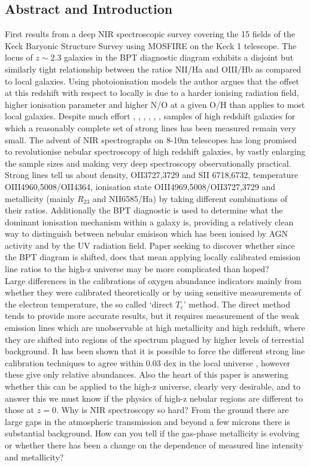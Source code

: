 \documentclass{literature}
\begin{document}
\subsection{Abstract and Introduction}
First results from a deep NIR spectroscopic survey covering the 15 fields of the Keck Baryonic Structure Survey using MOSFIRE on the Keck 1 telescope. The locus of $z\sim 2.3$ galaxies in the BPT diagnostic diagram exhibits a disjoint but similarly tight relationship between the ratios NII/Ha and OIII/Hb as compared to local galaxies. Using photoionisation models the author argues that the offset at this redshift with respect to locally is due to a harder ionising radiation field, higher ionisation parameter and higher N/O at a given O/H than applies to most local galaxies. Despite much effort \citep{Mannucci2010}, \citep{ForsterSchreiber2009}, \citep{Cullen2014}, \citep{Troncoso_2014}, \citep{Wuyts_2014}, \citep{Henry2013}, \citep{Maiolino2008} samples of high redshift galaxies for which a reasonably complete set of strong lines has been measured remain very small. The advent of NIR spectrographs on 8-10m telescopes has long promised to revolutionise nebular spectroscopy of high redshift galaxies, by vastly enlarging the sample sizes and making very deep spectroscopy observationally practical. Strong lines tell us about density, OII3727,3729 and SII 6718,6732,  temperature OIII4960,5008/OII4364, ionisation state OIII4969,5008/OII3727,3729 and metallicity (mainly $R_{23}$ and NII6585/Ha) by taking different combinations of their ratios. Additionally the BPT diagnostic is used to determine what the dominant ionisation mechanism within a galaxy is, providing a relatively clean way to distinguish between nebular emisison which has been ionised by AGN activity and by the UV radiation field. Paper seeking to discover whether since the BPT diagram is shifted, does that mean applying locally calibrated emission line ratios to the high-z universe may be more complicated than hoped? \\ 
Large differences in the calibrations of oxygen abundance indicators mainly from whether they were calibrated theoretically or by using sensitive measurements of the electron temperature, the so called `direct $T_{e}$' method. The direct method tends to provide more accurate results, but it requires measurement of the weak emission lines which are unobservable at high metallicity and high redshift, where they are shifted into regions of the spectrum plagued by higher levels of terrestial background. It has been shown that it is possible to force the different strong line calibration techniques to agree within 0.03 dex in the local universe \citep{Kewley_2008}, however these give only relative abundances. Also the heart of this paper is answering whether this can be applied to the high-z universe, clearly very desirable, and to answer this we must know if the physics of high-z nebular regions are different to those at $z=0$. Why is NIR spectroscopy so hard? From the ground there are large gaps in the atmospheric transmission and beyond a few microns there is substantial background. How can you tell if the gas-phase metallicity is evolving or whether there has been a change on the dependence of measured line intensity and metallicity? \\ 
\end{document}
